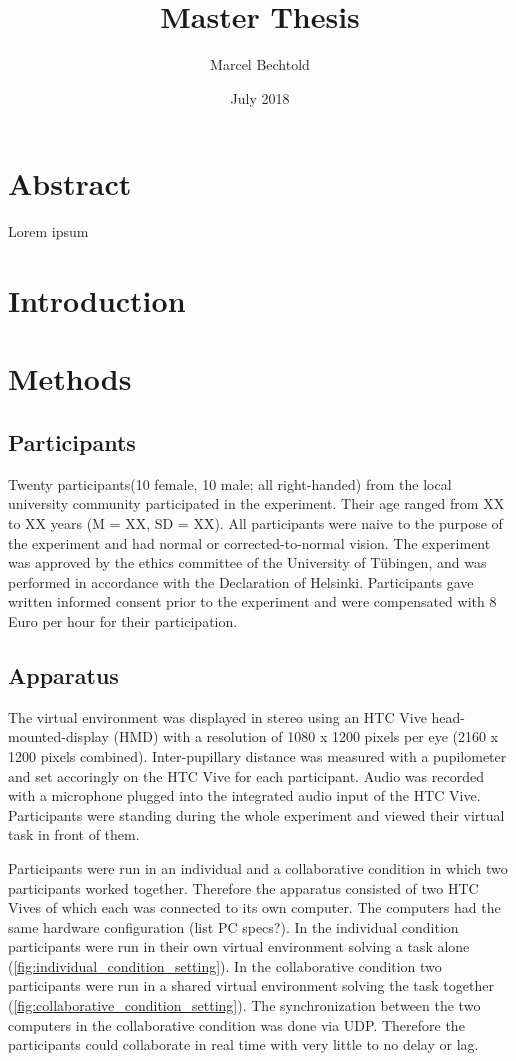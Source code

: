 \documentclass{article}
\title{Master Thesis}
\author{Marcel Bechtold}
\date{July 2018}
\begin{document}
\maketitle


\section{Abstract}

Lorem ipsum

\section{Introduction}


\section{Methods}

\subsection{Participants}
Twenty participants(10 female, 10 male; all right-handed) from the local university community participated in the experiment. Their age ranged from XX to XX years (M = XX, SD = XX). All participants were naive to the purpose of the experiment and had normal or corrected-to-normal vision. The experiment was approved by the ethics committee of the University of T\"ubingen, and was performed in accordance with the Declaration of Helsinki. Participants gave written informed consent prior to the experiment and were compensated with 8 Euro per hour for their participation. 

\subsection{Apparatus}
The virtual environment was displayed in stereo using an HTC Vive head-mounted-display (HMD) with a resolution of 1080 x 1200 pixels per eye (2160 x 1200 pixels combined). Inter-pupillary distance was measured with a pupilometer and set accoringly on the HTC Vive for each participant. Audio was recorded with a microphone plugged into the integrated audio input of the HTC Vive. Participants were standing during the whole experiment and viewed their virtual task in front of them.

Participants were run in an individual and a collaborative condition in which two participants worked together. Therefore the apparatus consisted of two HTC Vives of which each was connected to its own computer. The computers had the same hardware configuration (list PC specs?). In the individual condition participants were run in their own virtual environment solving a task alone (\ref{fig:individual_condition_setting}). In the collaborative condition two participants were run in a shared virtual environment solving the task together (\ref{fig:collaborative_condition_setting}). The synchronization between the two computers in the collaborative condition was done via UDP. Therefore the participants could collaborate in real time with very little to no delay or lag.
\end{document}
